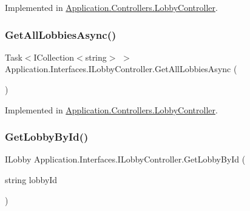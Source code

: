 Implemented in \mbox{\hyperlink{class_application_1_1_controllers_1_1_lobby_controller_a1aec115271209fc4ea59ed5f790d3011}{Application.\+Controllers.\+Lobby\+Controller}}.

\mbox{\label{interface_application_1_1_interfaces_1_1_i_lobby_controller_acf938121367844d623fa4127cf643e50}} 
\subsubsection{\texorpdfstring{Get\+All\+Lobbies\+Async()}{GetAllLobbiesAsync()}}
{\footnotesize\ttfamily Task$<$I\+Collection$<$string$>$ $>$ Application.\+Interfaces.\+I\+Lobby\+Controller.\+Get\+All\+Lobbies\+Async (\begin{DoxyParamCaption}{ }\end{DoxyParamCaption})}



Implemented in \mbox{\hyperlink{class_application_1_1_controllers_1_1_lobby_controller_a881adadc726a5daa68fe702439723630}{Application.\+Controllers.\+Lobby\+Controller}}.

\mbox{\label{interface_application_1_1_interfaces_1_1_i_lobby_controller_aaa584fec6fc0e1e0690aa81e7fde3af2}} 
\subsubsection{\texorpdfstring{Get\+Lobby\+By\+Id()}{GetLobbyById()}}
{\footnotesize\ttfamily I\+Lobby Application.\+Interfaces.\+I\+Lobby\+Controller.\+Get\+Lobby\+By\+Id (\begin{DoxyParamCaption}\item[{string}]{lobby\+Id }\end{DoxyParamCaption})}



